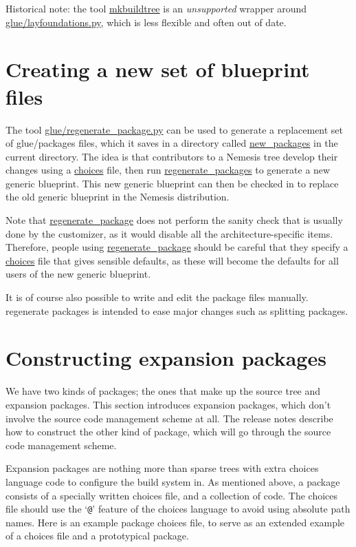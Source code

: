 \documentclass[a4paper]{article}
\begin{document}
Historical note: the tool \url{mkbuildtree} is an \emph{unsupported}
wrapper around \url{glue/layfoundations.py}, which is less flexible
and often out of date. 

\section{Creating a new set of blueprint files}

The tool \url{glue/regenerate_package.py} can be used to generate a
replacement set of glue/packages files, which it saves in a directory
called \url{new_packages} in the current directory.  The idea is that
contributors to a Nemesis tree develop their changes using a
\url{choices} file, then run \url{regenerate_packages} to generate a
new generic blueprint. This new generic blueprint can then be checked
in to replace the old generic blueprint in the Nemesis distribution.

Note that \url{regenerate_package} does not perform the sanity check
that is usually done by the customizer, as it would disable all the
architecture-specific items.  Therefore, people using
\url{regenerate_package} should be careful that they specify a
\url{choices} file that gives sensible defaults, as these will become
the defaults for all users of the new generic blueprint.

It is of course also possible to write and edit the package files
manually. regenerate packages is intended to ease major changes such
as splitting packages.

\section{Constructing expansion packages}

We have two kinds of packages; the ones that make up the
source tree and expansion packages. This section introduces expansion
packages, which don't involve the source code management scheme at
all. The release notes describe how to construct the other kind of
package, which will go through the source code management scheme.

Expansion packages are nothing more than sparse trees with extra
choices language code to configure the build system in.  As mentioned
above, a package consists of a specially written choices file, and a
collection of code. The choices file should use the `\texttt{@}'
feature of the choices language to avoid using absolute path
names. Here is an example package choices file, to serve as an
extended example of a choices file and a prototypical package.
\end{document}
